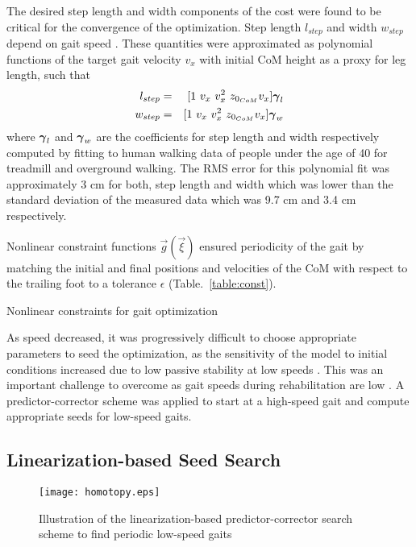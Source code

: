 The desired step length and width components of the cost were found to be critical for the convergence of the optimization. Step length $ l_{step} $ and width $ w_{step} $ depend on gait speed \cite{andriacchi1977walking}. These quantities were approximated as polynomial functions of the target gait velocity $ v_x $ with initial CoM height as a proxy for leg length, such that
\begin{eqnarray}
	l_{step} &=& [1\ v_x\ v_x^2\ z_{0_{CoM}} v_x] \boldsymbol{\gamma}_l \\
	w_{step} &=& [1\ v_x\ v_x^2\ z_{0_{CoM}} v_x] \boldsymbol{\gamma}_w
\end{eqnarray}
%
where $ \boldsymbol{\gamma}_l $ and $ \boldsymbol{\gamma}_w $ are the coefficients for step length and width respectively computed by fitting to human walking data of people under the age of 40 for treadmill and overground walking. The RMS error for this polynomial fit was approximately 3 cm for both, step length and width which was lower than the standard deviation of the measured data which was 9.7 cm and 3.4 cm respectively.

Nonlinear constraint functions $ \vec{g}(\vec{\xi}) $ ensured periodicity of the gait by matching the initial and final positions and velocities of the CoM with respect to the trailing foot to a tolerance $ \epsilon $ (Table.~\ref{table:const}). 
%
\begin{table}
	\centering
    \caption{Nonlinear constraints for gait optimization}
    \label{table:const}
	
\end{table}
%

As speed decreased, it was progressively difficult to choose appropriate parameters to seed the optimization, as the sensitivity of the model to initial conditions increased due to low passive stability at low speeds \cite{kuo2001simple}. This was an important challenge to overcome as gait speeds during rehabilitation are low \cite{seethapathi2015metabolic}. A predictor-corrector scheme was applied to start at a high-speed gait and compute appropriate seeds for low-speed gaits. 

\subsection{Linearization-based Seed Search}

\begin{figure}
	\centering
	\texttt{[image: homotopy.eps]}
	\caption{Illustration of the linearization-based predictor-corrector search scheme to find periodic low-speed gaits}\label{fig:homotopy}
\end{figure}


